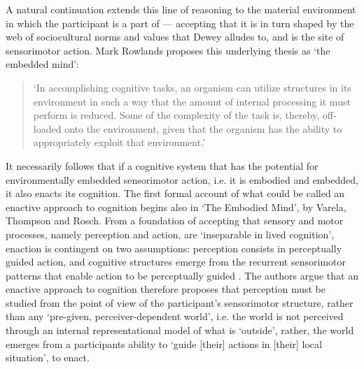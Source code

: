 A natural continuation extends this line of reasoning to the material environment in which the participant is a part of — accepting that it is in turn shaped by the web of sociocultural norms and values that Dewey alludes to, and is the site of sensorimotor action. Mark Rowlands proposes this underlying thesis as `the embedded mind':
\begin{quote}
    `In accomplishing cognitive tasks, an organism can utilize structures in its environment in such a way that the amount of internal processing it must perform is reduced. Some of the complexity of the task is, thereby, off-loaded onto the environment, given that the organism has the ability to appropriately exploit that environment.' \citeyearpar[p. 68]{rowlands2010}  
\end{quote}
It necessarily follows that if a cognitive system that has the potential for environmentally embedded sensorimotor action, i.e. it is embodied and embedded, it also enacts its cognition. The first formal account of what could be called an enactive approach to cognition begins also in `The Embodied Mind', by Varela, Thompson and Rosch. From a foundation of accepting that sensory and motor processes, namely perception and action, are `inseparable in lived cognition', enaction is contingent on two assumptions: perception consists in perceptually guided action, and cognitive structures emerge from the recurrent sensorimotor patterns that enable action to be perceptually guided \citeyearpar[p. 173]{varela1993}. The authors argue that an enactive approach to cognition therefore proposes that perception must be studied from the point of view of the participant's sensorimotor structure, rather than any `pre-given, perceiver-dependent world', i.e. the world is not perceived through an internal representational model of what is `outside', rather, the world emerges from a participants ability to `guide [their] actions in [their] local situation', to enact.

